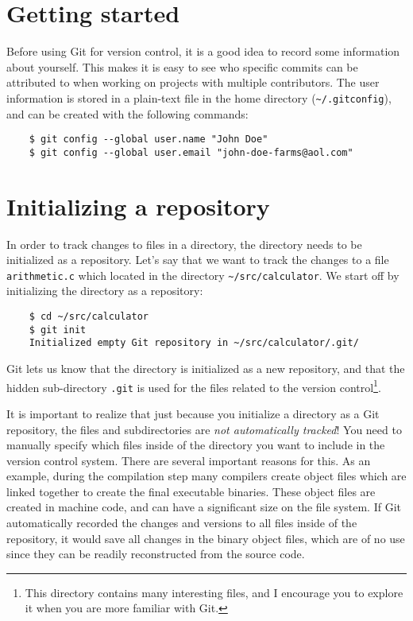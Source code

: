 \documentclass[11pt]{article}
\begin{document}
\section{Getting started}
Before using Git for version control, it is a good idea to record some 
information about yourself. This makes it is easy to see who specific commits 
can be attributed to when working on projects with multiple contributors.  The 
user information is stored in a plain-text file in the home directory 
(\texttt{\textasciitilde/.gitconfig}), and can be created with the following 
commands:
\begin{lstlisting}
    $ git config --global user.name "John Doe"
    $ git config --global user.email "john-doe-farms@aol.com"
\end{lstlisting}

\section{Initializing a repository}
In order to track changes to files in a directory, the directory needs to be 
initialized as a repository.  Let's say that we want to track the changes to a 
file \texttt{arithmetic.c} which located in the directory 
\texttt{\textasciitilde/src/calculator}.  We start off by initializing the 
directory as a repository:
\begin{lstlisting}
    $ cd ~/src/calculator
    $ git init
    Initialized empty Git repository in ~/src/calculator/.git/
\end{lstlisting}
Git lets us know that the directory is initialized as a new repository, and that 
the hidden sub-directory \texttt{.git} is used for the files related to the 
version control\footnote{This directory contains many interesting files, and I 
    encourage you to explore it when you are more familiar with Git.}.

It is important to realize that just because you initialize a directory as a Git 
repository, the files and subdirectories are \emph{not automatically tracked}!  
You need to manually specify which files inside of the directory you want to 
include in the version control system.  There are several important reasons for 
this.  As an example, during the compilation step many compilers create object 
files which are linked together to create the final executable binaries.  These 
object files are created in machine code, and can have a significant size on the 
file system.  If Git automatically recorded the changes and versions to all 
files inside of the repository, it would save all changes in the binary object 
files, which are of no use since they can be readily reconstructed from the 
source code.
\end{document}
